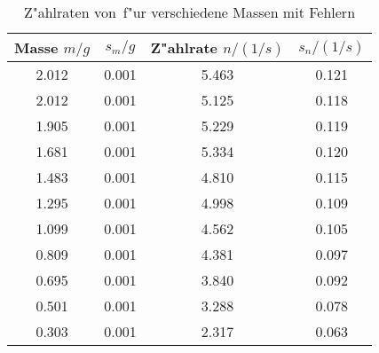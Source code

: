 \begin{table}[H]
\caption{Z"ahlraten von \kalium\,f"ur verschiedene Massen mit Fehlern}
\begin{center}
\begin{tabular}{|c|c|c|c|}
  \hline
  Masse $m / g$ & $s_m / g$  & Z"ahlrate $n / (1/s)$ & $s_n / (1/s)$ \\ \hline 
  2.012 & 0.001 & 5.463 & 0.121 \\ \hline
  2.012 & 0.001 & 5.125 & 0.118 \\ \hline
  1.905 & 0.001 & 5.229 & 0.119 \\ \hline
  1.681 & 0.001 & 5.334 & 0.120 \\ \hline
  1.483 & 0.001 & 4.810 & 0.115 \\ \hline
  1.295 & 0.001 & 4.998 & 0.109 \\ \hline
  1.099 & 0.001 & 4.562 & 0.105 \\ \hline
  0.809 & 0.001 & 4.381 & 0.097 \\ \hline
  0.695 & 0.001 & 3.840 & 0.092 \\ \hline
  0.501 & 0.001 & 3.288 & 0.078 \\ \hline
  0.303 & 0.001 & 2.317 & 0.063 \\ \hline
\end{tabular}
\end{center}
\label{tab:data:kalium}
\end{table}

